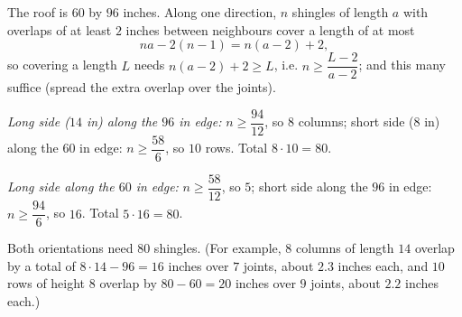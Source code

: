 The roof is $60$ by $96$ inches. Along one direction, $n$ shingles of length $a$ with overlaps of at least $2$ inches between neighbours cover a length of at most
\[na-2(n-1)=n(a-2)+2,\]
so covering a length $L$ needs $n(a-2)+2\ge L$, i.e. $n\ge\dfrac{L-2}{a-2}$; and this many suffice (spread the extra overlap over the joints).

\emph{Long side ($14$ in) along the $96$ in edge:} $n\ge\dfrac{94}{12}$, so $8$ columns; short side ($8$ in) along the $60$ in edge: $n\ge\dfrac{58}{6}$, so $10$ rows. Total $8\cdot10=80$.

\emph{Long side along the $60$ in edge:} $n\ge\dfrac{58}{12}$, so $5$; short side along the $96$ in edge: $n\ge\dfrac{94}{6}$, so $16$. Total $5\cdot16=80$.

Both orientations need $\boxed{80}$ shingles. (For example, $8$ columns of length $14$ overlap by a total of $8\cdot14-96=16$ inches over $7$ joints, about $2.3$ inches each, and $10$ rows of height $8$ overlap by $80-60=20$ inches over $9$ joints, about $2.2$ inches each.)
